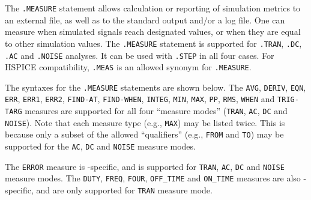 

\label{Measure_section}

The \texttt{.MEASURE} statement allows calculation or reporting of simulation 
metrics to an external file, as well as to the standard output and/or a log file.  One can 
measure when simulated signals reach designated values, or when they are equal
to other simulation values.  The \texttt{.MEASURE} statement is supported for 
\texttt{.TRAN}, \texttt{.DC}, \texttt{.AC} and \texttt{.NOISE} analyses.  It can
be used with {\tt .STEP}  in all four cases.  For HSPICE compatibility,
\texttt{.MEAS} is an allowed synonym for \texttt{.MEASURE}.

The syntaxes for the \texttt{.MEASURE} statements are shown below.  The \texttt{AVG},
\texttt{DERIV}, \texttt{EQN},   \texttt{ERR},  \texttt{ERR1}, \texttt{ERR2}, \texttt{FIND-AT},
\texttt{FIND-WHEN}, \texttt{INTEG}, \texttt{MIN}, \texttt{MAX}, \texttt{PP}, \texttt{RMS},
\texttt{WHEN} and \texttt{TRIG-TARG} measures are supported for all four ``measure modes''
(\texttt{TRAN}, \texttt{AC}, \texttt{DC} and \texttt{NOISE}).  Note that each measure
type (e.g., \texttt{MAX}) may be listed
twice. This is because only a subset of the allowed ``qualifiers'' (e.g., \texttt{FROM} and
\texttt{TO}) may be supported for the \texttt{AC}, \texttt{DC} and \texttt{NOISE} measure modes.

The \texttt{ERROR} measure is \Xyce{}-specific, and is supported for \texttt{TRAN}, \texttt{AC},
\texttt{DC} and \texttt{NOISE} measure modes.  The \texttt{DUTY}, \texttt{FREQ}, \texttt{FOUR},
\texttt{OFF\_TIME} and \texttt{ON\_TIME} measures are also \Xyce{}-specific, and are  only
supported for \texttt{TRAN} measure mode.

